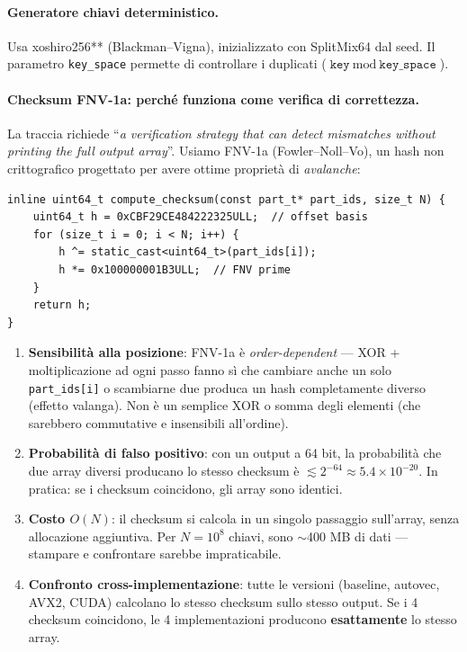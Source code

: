 \documentclass[11pt,a4paper]{article}
\begin{document}
\paragraph{Generatore chiavi deterministico.} Usa xoshiro256** (Blackman--Vigna), inizializzato con SplitMix64 dal seed. Il parametro \texttt{key\_space} permette di controllare i duplicati ($\texttt{key} \bmod \texttt{key\_space}$).

\paragraph{Checksum FNV-1a: perché funziona come verifica di correttezza.}

La traccia richiede ``\textit{a verification strategy that can detect mismatches without printing the full output array}''. Usiamo FNV-1a (Fowler--Noll--Vo), un hash non crittografico progettato per avere ottime proprietà di \textit{avalanche}:

\begin{lstlisting}
inline uint64_t compute_checksum(const part_t* part_ids, size_t N) {
    uint64_t h = 0xCBF29CE484222325ULL;  // offset basis
    for (size_t i = 0; i < N; i++) {
        h ^= static_cast<uint64_t>(part_ids[i]);
        h *= 0x100000001B3ULL;  // FNV prime
    }
    return h;
}
\end{lstlisting}

\begin{theorybox}[title=\textbf{Perché il checksum assicura correttezza}]
\begin{enumerate}
    \item \textbf{Sensibilità alla posizione}: FNV-1a è \textit{order-dependent} --- XOR + moltiplicazione ad ogni passo fanno sì che cambiare anche un solo \texttt{part\_ids[i]} o scambiarne due produca un hash completamente diverso (effetto valanga). Non è un semplice XOR o somma degli elementi (che sarebbero commutative e insensibili all'ordine).
    \item \textbf{Probabilità di falso positivo}: con un output a 64 bit, la probabilità che due array diversi producano lo stesso checksum è $\lesssim 2^{-64} \approx 5.4 \times 10^{-20}$. In pratica: se i checksum coincidono, gli array sono identici.
    \item \textbf{Costo $O(N)$}: il checksum si calcola in un singolo passaggio sull'array, senza allocazione aggiuntiva. Per $N=10^8$ chiavi, sono $\sim$400 MB di dati --- stampare e confrontare sarebbe impraticabile.
    \item \textbf{Confronto cross-implementazione}: tutte le versioni (baseline, autovec, AVX2, CUDA) calcolano lo stesso checksum sullo stesso output. Se i 4 checksum coincidono, le 4 implementazioni producono \textbf{esattamente} lo stesso array.
\end{enumerate}
\end{theorybox}
\end{document}
